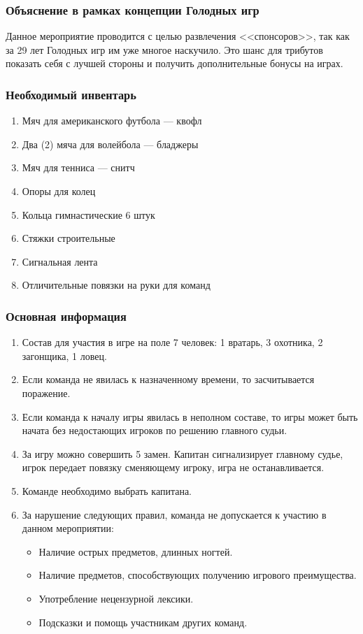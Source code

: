 
\subsubsection*{Объяснение в рамках концепции Голодных игр}
\par Данное мероприятие проводится с целью развлечения <<спонсоров>>, так как за 29 лет Голодных игр им уже многое наскучило. Это шанс для трибутов показать себя с лучшей стороны и получить дополнительные бонусы на играх.

\subsubsection*{Необходимый инвентарь}
\begin{enumerate}
\item Мяч для американского футбола --- квофл
\item Два (2) мяча для волейбола --- бладжеры
\item Мяч для тенниса --- снитч
\item Опоры для колец
\item Кольца гимнастические 6 штук
\item Стяжки строительные
\item Сигнальная лента
\item Отличительные повязки на руки для команд
\end{enumerate}

\subsubsection*{Основная информация}
\begin{enumerate}
\item Состав для участия в игре на поле 7 человек: 1 вратарь, 3 охотника, 2 загонщика, 1 ловец.
\item Если команда не явилась к назначенному времени, то засчитывается поражение.
\item Если команда к началу игры явилась в неполном составе, то игры может быть начата без недостающих игроков по решению главного судьи.
\item За игру можно совершить 5 замен. Капитан сигнализирует главному судье, игрок передает повязку сменяющему игроку, игра не останавливается.
\item Команде необходимо выбрать капитана.
\item За нарушение следующих правил, команда не допускается к участию в данном мероприятии:
	\begin{itemize}
	\item Наличие острых предметов, длинных ногтей.
	\item Наличие предметов, способствующих получению игрового преимущества.
	\item Употребление нецензурной лексики.
	\item Подсказки и помощь участникам других команд.
	\end{itemize}
\end{enumerate}


